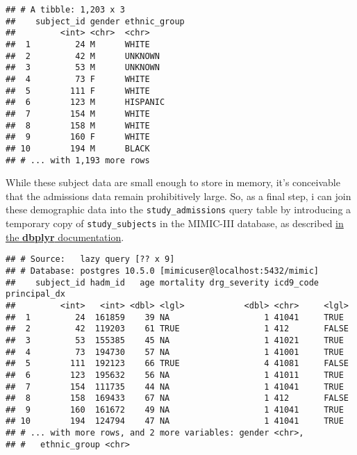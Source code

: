 \documentclass[]{article}
\newenvironment{Shaded}{\begin{snugshade}}{\end{snugshade}}
\newcommand{\KeywordTok}[1]{\textcolor[rgb]{0.13,0.29,0.53}{\textbf{#1}}}
\newcommand{\DataTypeTok}[1]{\textcolor[rgb]{0.13,0.29,0.53}{#1}}
\newcommand{\StringTok}[1]{\textcolor[rgb]{0.31,0.60,0.02}{#1}}
\newcommand{\OtherTok}[1]{\textcolor[rgb]{0.56,0.35,0.01}{#1}}
\newcommand{\OperatorTok}[1]{\textcolor[rgb]{0.81,0.36,0.00}{\textbf{#1}}}
\newcommand{\NormalTok}[1]{#1}
\begin{document}
\begin{verbatim}
## # A tibble: 1,203 x 3
##    subject_id gender ethnic_group
##         <int> <chr>  <chr>       
##  1         24 M      WHITE       
##  2         42 M      UNKNOWN     
##  3         53 M      UNKNOWN     
##  4         73 F      WHITE       
##  5        111 F      WHITE       
##  6        123 M      HISPANIC    
##  7        154 M      WHITE       
##  8        158 M      WHITE       
##  9        160 F      WHITE       
## 10        194 M      BLACK       
## # ... with 1,193 more rows
\end{verbatim}

While these subject data are small enough to store in memory, it's
conceivable that the admissions data remain prohibitively large. So, as
a final step, i can join these demographic data into the
\texttt{study\_admissions} query table by introducing a temporary copy
of \texttt{study\_subjects} in the MIMIC-III database, as described
\href{https://dbplyr.tidyverse.org/reference/join.tbl_sql.html}{in the
\textbf{dbplyr} documentation}.

\begin{Shaded}
\end{Shaded}

\begin{verbatim}
## # Source:   lazy query [?? x 9]
## # Database: postgres 10.5.0 [mimicuser@localhost:5432/mimic]
##    subject_id hadm_id   age mortality drg_severity icd9_code principal_dx
##         <int>   <int> <dbl> <lgl>            <dbl> <chr>     <lgl>       
##  1         24  161859    39 NA                   1 41041     TRUE        
##  2         42  119203    61 TRUE                 1 412       FALSE       
##  3         53  155385    45 NA                   1 41021     TRUE        
##  4         73  194730    57 NA                   1 41001     TRUE        
##  5        111  192123    66 TRUE                 4 41081     FALSE       
##  6        123  195632    56 NA                   1 41011     TRUE        
##  7        154  111735    44 NA                   1 41041     TRUE        
##  8        158  169433    67 NA                   1 412       FALSE       
##  9        160  161672    49 NA                   1 41041     TRUE        
## 10        194  124794    47 NA                   1 41041     TRUE        
## # ... with more rows, and 2 more variables: gender <chr>,
## #   ethnic_group <chr>
\end{verbatim}
\end{document}

